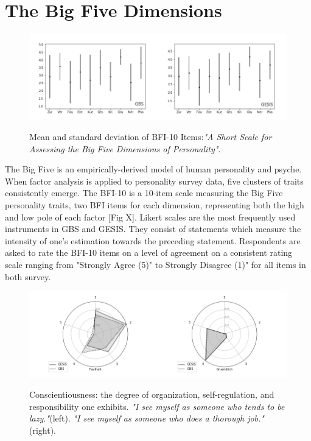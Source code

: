 \section{The Big Five Dimensions}

\begin{figure}[ht]
	\begin{center}
		\includegraphics[scale=0.55,angle=0]{fig/std_figure}
		\label{std}
		\caption{Mean and standard deviation of BFI-10 Items:\textit{"A Short Scale for Assessing the Big Five Dimensions of Personality"}.}
	\end{center}
\end{figure}

The Big Five is an empirically-derived model of human personality and psyche. When factor analysis is applied to personality survey data, five clusters of traits consistently emerge. The BFI-10 is a 10-item scale measuring the Big Five personality traits, two BFI items for each dimension, representing both the high and low pole of each factor [Fig X]. Likert scales are the most frequently used instruments in GBS and GESIS. They consist of statements which measure the intensity of one's estimation towards the preceding statement. Respondents are asked to rate the BFI-10 items on a level of agreement on a consistent rating scale ranging from "Strongly Agree (5)" to Strongly Disagree (1)" for all items in both survey.

\begin{figure}[H]
	\begin{center}
		\includegraphics[scale=0.52,angle=0]{fig/Conscientiousness_figure}
		\label{Conscientiousness}
		\caption{Conscientiousness: the degree of organization, self-regulation, and responsibility one exhibits. \textit{"I see myself as someone who tends to be lazy."}(left). \textit{"I see myself as someone who does a thorough job."}(right).}
	\end{center}
\end{figure}

